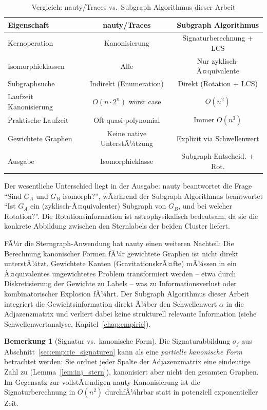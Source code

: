 ﻿\documentclass[a4paper,12pt]{report}
\theoremstyle{definition}
\newtheorem{bemerkung}{Bemerkung}
\begin{document}
\begin{table}[H]
\centering
\caption{Vergleich: nauty/Traces vs.\ Subgraph Algorithmus dieser Arbeit}
\label{tab:nauty}
\begin{tabular}{lcc}
\toprule
Eigenschaft & nauty/Traces & Subgraph Algorithmus \\
\midrule
Kernoperation           & Kanonisierung              & Signaturberechnung + LCS \\
Isomorphieklassen       & Alle                        & Nur zyklisch-Ã¤quivalente \\
Subgraphsuche           & Indirekt (Enumeration)      & Direkt (Rotation + LCS) \\
Laufzeit Kanonisierung  & $O(n \cdot 2^n)$ worst case & $O(n^2)$ \\
Praktische Laufzeit     & Oft quasi-polynomial        & Immer $O(n^3)$ \\
Gewichtete Graphen      & Keine native UnterstÃ¼tzung  & Explizit via Schwellenwert \\
Ausgabe                 & Isomorphieklasse            & Subgraph-Entscheid. + Rot. \\
\bottomrule
\end{tabular}
\end{table}

Der wesentliche Unterschied liegt in der Ausgabe: nauty beantwortet die Frage ``Sind $G_A$ und $G_B$ isomorph?'', wÃ¤hrend der Subgraph Algorithmus beantwortet ``Ist $G_A$ ein (zyklisch-Ã¤quivalenter) Subgraph von $G_B$, und bei welcher Rotation?''. Die Rotationsinformation ist astrophysikalisch bedeutsam, da sie die konkrete Abbildung zwischen den Sternlabels der beiden Cluster liefert.

FÃ¼r die Sterngraph-Anwendung hat nauty einen weiteren Nachteil: Die Berechnung kanonischer Formen fÃ¼r gewichtete Graphen ist nicht direkt unterstÃ¼tzt. Gewichtete Kanten (GravitationskrÃ¤fte) mÃ¼ssen in ein Ã¤quivalentes ungewichtetes Problem transformiert werden -- etwa durch Diskretisierung der Gewichte zu Labels -- was zu Informationsverlust oder kombinatorischer Explosion fÃ¼hrt. Der Subgraph Algorithmus dieser Arbeit integriert die Gewichtsinformation direkt Ã¼ber den Schwellenwert $\alpha$ in die Adjazenzmatrix und verliert dabei keine strukturell relevante Information (siehe Schwellenwertanalyse, Kapitel~\ref{chap:empirie}).

\begin{bemerkung}[Signatur vs.\ kanonische Form]
Die Signaturabbildung $\sigma_j$ aus Abschnitt~\ref{sec:empirie_signaturen} kann als eine \emph{partielle kanonische Form} betrachtet werden: Sie ordnet jeder Spalte der Adjazenzmatrix eine eindeutige Zahl zu (Lemma~\ref{lem:inj_stern}), kanonisiert aber nicht den gesamten Graphen. Im Gegensatz zur vollstÃ¤ndigen nauty-Kanonisierung ist die Signaturberechnung in $O(n^2)$ durchfÃ¼hrbar statt in potenziell exponentieller Zeit.
\end{bemerkung}
\end{document}
